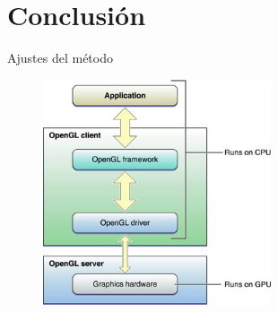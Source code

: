 \documentclass{beamer}
\begin{document}
\section{Conclusión}
\begin{frame}{Ajustes del método}
  \begin{figure}[h]
    \centering
    \includegraphics[width=0.6\textwidth]{img/cpu_gpu}
  \end{figure}

\end{frame}
\end{document}
